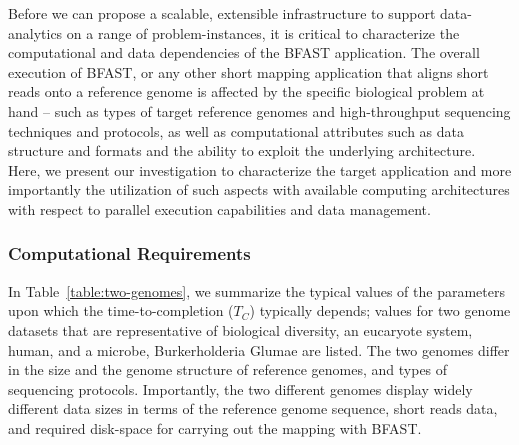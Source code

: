 \documentclass{cpeauth}
\begin{document}

Before we can propose a scalable, extensible infrastructure to support
data-analytics on a range of problem-instances, it is critical to
characterize the computational and data dependencies of the BFAST
application.  The overall execution of BFAST, or any other short
mapping application that aligns short reads onto a reference genome is
affected by the specific biological problem at hand -- such as types
of target reference genomes and high-throughput sequencing techniques
and protocols, as well as computational attributes such as data
structure and formats and the ability to exploit the underlying
architecture.  Here, we present our investigation to characterize the
target application and more importantly the utilization of such
aspects with available computing architectures with respect to
parallel execution capabilities and data management.

\subsubsection{Computational Requirements}


In Table~\ref{table:two-genomes}, we summarize the typical values of
the parameters upon which the time-to-completion ($T_C$) typically
depends; values for two genome datasets that are representative of
biological diversity, an eucaryote system, human, and a microbe,
Burkerholderia Glumae\cite{kim2011} are listed. The two genomes differ
in the size and the genome structure of reference genomes, and types
of sequencing protocols.  Importantly, the two different genomes
display widely different data sizes in terms of the reference genome
sequence, short reads data, and required disk-space for carrying out
the mapping with BFAST.
\end{document}
